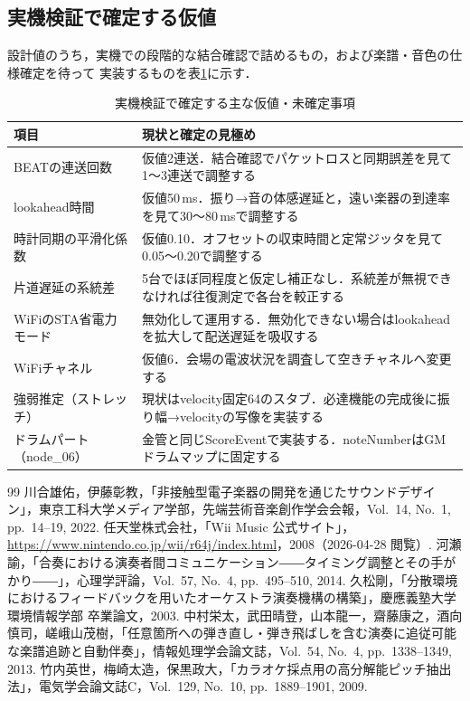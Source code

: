 \documentclass[lualatex,book,paper=a4paper,jafontsize=11.5pt,jafontscale=1.05]{jlreq}
\begin{document}
\subsection{実機検証で確定する仮値}
設計値のうち，実機での段階的な結合確認で詰めるもの，および楽譜・音色の仕様確定を待って
実装するものを表\ref{tab:tbd}に示す．
\begin{table}[H]\centering
  \caption{実機検証で確定する主な仮値・未確定事項}\label{tab:tbd}
  \small
  \begin{tabularx}{\linewidth}{>{\raggedright\arraybackslash}p{3.0cm} X}
    \toprule
    項目 & 現状と確定の見極め \\
    \midrule
    BEATの連送回数 & 仮値2連送．結合確認でパケットロスと同期誤差を見て1〜3連送で調整する \\
    lookahead時間 & 仮値50\,ms．振り→音の体感遅延と，遠い楽器の到達率を見て30〜80\,msで調整する \\
    時計同期の平滑化係数 & 仮値0.10．オフセットの収束時間と定常ジッタを見て0.05〜0.20で調整する \\
    片道遅延の系統差 & 5台でほぼ同程度と仮定し補正なし．系統差が無視できなければ往復測定で各台を較正する \\
    WiFiのSTA省電力モード & 無効化して運用する．無効化できない場合はlookaheadを拡大して配送遅延を吸収する \\
    WiFiチャネル & 仮値6．会場の電波状況を調査して空きチャネルへ変更する \\
    強弱推定（ストレッチ） & 現状はvelocity固定64のスタブ．必達機能の完成後に振り幅→velocityの写像を実装する \\
    ドラムパート（node\_06） & 金管と同じScoreEventで実装する．noteNumberはGMドラムマップに固定する \\
    \bottomrule
  \end{tabularx}
\end{table}

\begin{thebibliography}{99}
 川合雄佑，伊藤彰教，「非接触型電子楽器の開発を通じたサウンドデザイン」，東京工科大学メディア学部，先端芸術音楽創作学会会報，Vol.~14, No.~1, pp.~14--19, 2022.
 任天堂株式会社，「Wii Music 公式サイト」，\url{https://www.nintendo.co.jp/wii/r64j/index.html}，2008（2026-04-28 閲覧）.
 河瀬諭，「合奏における演奏者間コミュニケーション――タイミング調整とその手がかり――」，心理学評論，Vol.~57, No.~4, pp.~495--510, 2014.
 久松剛，「分散環境におけるフィードバックを用いたオーケストラ演奏機構の構築」，慶應義塾大学 環境情報学部 卒業論文，2003.
 中村栄太，武田晴登，山本龍一，齋藤康之，酒向慎司，嵯峨山茂樹，「任意箇所への弾き直し・弾き飛ばしを含む演奏に追従可能な楽譜追跡と自動伴奏」，情報処理学会論文誌，Vol.~54, No.~4, pp.~1338--1349, 2013.
 竹内英世，梅崎太造，保黒政大，「カラオケ採点用の高分解能ピッチ抽出法」，電気学会論文誌C，Vol.~129, No.~10, pp.~1889--1901, 2009.
\end{thebibliography}
\end{document}
